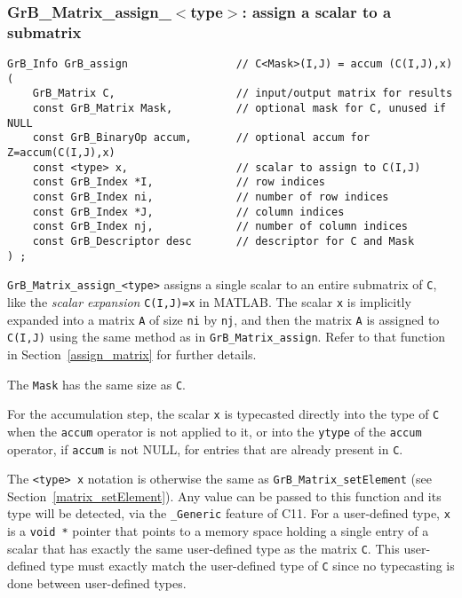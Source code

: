 \documentclass[12pt]{article}
\begin{document}
\subsubsection{{\sf GrB\_Matrix\_assign\_$<$type$>$:} assign a scalar to a submatrix}
\label{assign_matrix_scalar}

\begin{mdframed}[userdefinedwidth=6in]
{\footnotesize
\begin{verbatim}
GrB_Info GrB_assign                 // C<Mask>(I,J) = accum (C(I,J),x)
(
    GrB_Matrix C,                   // input/output matrix for results
    const GrB_Matrix Mask,          // optional mask for C, unused if NULL
    const GrB_BinaryOp accum,       // optional accum for Z=accum(C(I,J),x)
    const <type> x,                 // scalar to assign to C(I,J)
    const GrB_Index *I,             // row indices
    const GrB_Index ni,             // number of row indices
    const GrB_Index *J,             // column indices
    const GrB_Index nj,             // number of column indices
    const GrB_Descriptor desc       // descriptor for C and Mask
) ;
\end{verbatim} } \end{mdframed}

\verb'GrB_Matrix_assign_<type>' assigns a single scalar to an entire
submatrix of \verb'C', like the {\em scalar expansion} \verb'C(I,J)=x' in
MATLAB.  The scalar \verb'x' is implicitly expanded into a matrix \verb'A' of
size \verb'ni' by \verb'nj', and then the matrix \verb'A' is assigned to
\verb'C(I,J)' using the same method as in \verb'GrB_Matrix_assign'.  Refer
to that function in Section~\ref{assign_matrix} for further details.

The \verb'Mask' has the same size as \verb'C'.

For the accumulation step, the scalar \verb'x' is typecasted directly into the
type of \verb'C' when the \verb'accum' operator is not applied to it, or into
the \verb'ytype' of the \verb'accum' operator, if \verb'accum' is not NULL, for
entries that are already present in \verb'C'.

The \verb'<type> x' notation is otherwise the same as
\verb'GrB_Matrix_setElement' (see Section~\ref{matrix_setElement}).  Any value
can be passed to this function and its type will be detected, via the
\verb'_Generic' feature of C11.  For a user-defined type, \verb'x' is a
\verb'void *' pointer that points to a memory space holding a single entry of a
scalar that has exactly the same user-defined type as the matrix \verb'C'.
This user-defined type must exactly match the user-defined type of \verb'C'
since no typecasting is done between user-defined types.
\end{document}
